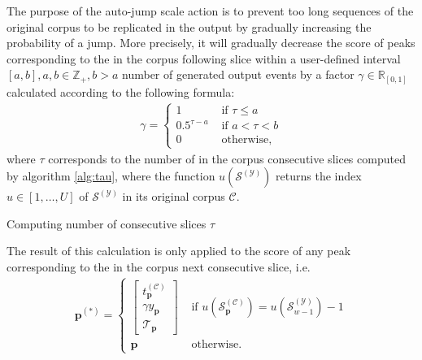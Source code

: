 The purpose of the auto-jump scale action is to prevent too long sequences of the original corpus to be replicated in the output by gradually increasing the probability of a jump. More precisely, it will gradually decrease the score of peaks corresponding to the in the corpus following slice within a user-defined interval $[a, b], a, b \in \mathbb Z_+, b > a$ number of generated output events by a factor $\gamma \in \mathbb R_{[0,1]}$ calculated according to the following formula:
	\begin{align}
			\gamma = \left\lbrace\begin{array}{ll}
				1 & \text{ if } \tau \le a\\
				0.5^{\tau - a} & \text{ if } a < \tau < b\\
				0 & \text{ otherwise},
			\end{array}\right.
	\end{align}
	where $\tau$ corresponds to the number of in the corpus consecutive slices computed by algorithm \ref{alg:tau}, where the function $u\left(\mathcal S^{(\mathcal Y)}\right)$ returns the index $u\in[1,\dots,U]$ of $\mathcal S^{(\mathcal Y)}$ in its original corpus $\mathcal C$.
		\begin{algorithm}[h!]	
			\caption{Computing number of consecutive slices $\tau$}
			\begin{algorithmic}\label{alg:tau}
				\ENDWHILE
			\end{algorithmic}
		\end{algorithm}
The result of this calculation is only applied to the score of any peak corresponding to the in the corpus next consecutive slice, i.e.
	\begin{align}
		\bm p^{(\ast)} = \left\lbrace\begin{array}{cl}
				\begin{bmatrix} 
					t^{(\mathcal C)}_{\bm p} \\ \gamma y_{\bm p} \\ \mathcal T_{\bm p}
				\end{bmatrix} 
				& \text{ if } u\left(\mathcal S^{(\mathcal C)}_{\bm p}\right) = u\left(\mathcal S^{(\mathcal Y)}_{w-1}\right) - 1  \\ 
				\bm p & \text{ otherwise}.
			\end{array}\right.
	\end{align}


